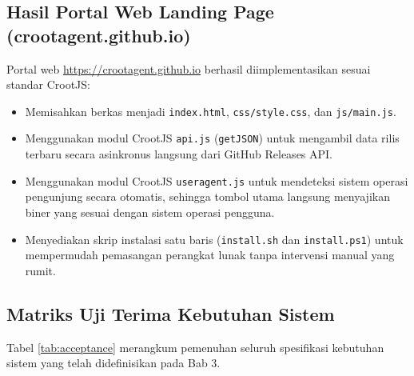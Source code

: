 \subsection{Hasil Portal Web Landing Page (crootagent.github.io)}
Portal web \url{https://crootagent.github.io} berhasil diimplementasikan sesuai standar CrootJS:
\begin{itemize}
    \item Memisahkan berkas menjadi \texttt{index.html}, \texttt{css/style.css}, dan \texttt{js/main.js}.
    \item Menggunakan modul CrootJS \texttt{api.js} (\texttt{getJSON}) untuk mengambil data rilis terbaru secara asinkronus langsung dari GitHub Releases API.
    \item Menggunakan modul CrootJS \texttt{useragent.js} untuk mendeteksi sistem operasi pengunjung secara otomatis, sehingga tombol utama langsung menyajikan biner yang sesuai dengan sistem operasi pengguna.
    \item Menyediakan skrip instalasi satu baris (\texttt{install.sh} dan \texttt{install.ps1}) untuk mempermudah pemasangan perangkat lunak tanpa intervensi manual yang rumit.
\end{itemize}

\subsection{Matriks Uji Terima Kebutuhan Sistem}
Tabel \ref{tab:acceptance} merangkum pemenuhan seluruh spesifikasi kebutuhan sistem yang telah didefinisikan pada Bab 3.

